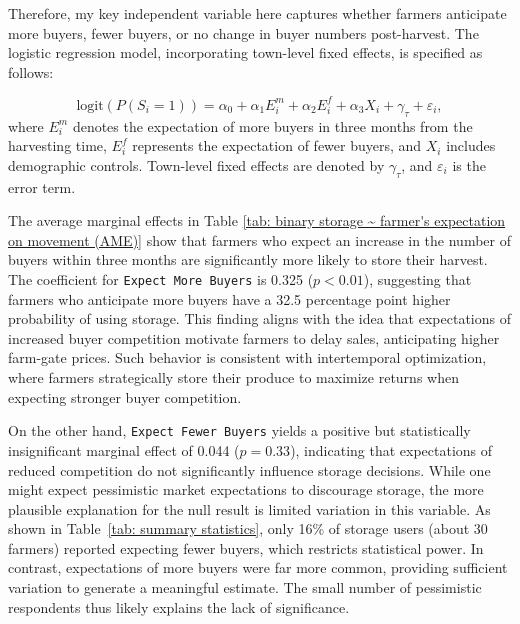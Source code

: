 


Therefore, my key independent variable here captures whether farmers anticipate more buyers, fewer buyers, or no change in buyer numbers post-harvest. The logistic regression model, incorporating town-level fixed effects, is specified as follows:

\begin{equation}
    \text{logit} \left( P(S_i = 1) \right) = \alpha_0 + \alpha_1 E^m_i + \alpha_2 E^f_i + \alpha_3 X_i + \gamma_\tau + \varepsilon_i,
\end{equation}
where $E^m_i$ denotes the expectation of more buyers in three months from the harvesting time, $E^f_i$ represents the expectation of fewer buyers, and $X_i$ includes demographic controls. Town-level fixed effects are denoted by $\gamma_\tau$, and $\varepsilon_i$ is the error term.




The average marginal effects in Table \ref{tab: binary storage ~ farmer's expectation on movement (AME)} show that farmers who expect an increase in the number of buyers within three months are significantly more likely to store their harvest. The coefficient for \texttt{Expect More Buyers} is 0.325 (\(p < 0.01\)), suggesting that farmers who anticipate more buyers have a 32.5 percentage point higher probability of using storage. This finding aligns with the idea that expectations of increased buyer competition motivate farmers to delay sales, anticipating higher farm-gate prices. Such behavior is consistent with intertemporal optimization, where farmers strategically store their produce to maximize returns when expecting stronger buyer competition.  

On the other hand, \texttt{Expect Fewer Buyers} yields a positive but statistically insignificant marginal effect of 0.044 ($p = 0.33$), indicating that expectations of reduced competition do not significantly influence storage decisions. While one might expect pessimistic market expectations to discourage storage, the more plausible explanation for the null result is limited variation in this variable. As shown in Table~\ref{tab: summary statistics}, only 16\% of storage users (about 30 farmers) reported expecting fewer buyers, which restricts statistical power. In contrast, expectations of more buyers were far more common, providing sufficient variation to generate a meaningful estimate. The small number of pessimistic respondents thus likely explains the lack of significance.

